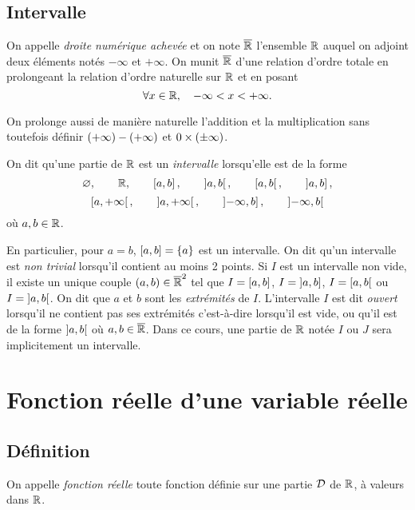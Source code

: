 \documentclass{magnoliaold}
\begin{document}
\subsection{Intervalle}


\begin{definition}[utile=-3]
On appelle \emph{droite numérique achevée} et on note $\overline{\mathbb{R}}$ l'ensemble $\mathbb{R}$ auquel
on adjoint deux éléments notés $-\infty$ et $+\infty$. On munit $\overline{\mathbb{R}}$ d'une
relation d'ordre totale en prolongeant la relation d'ordre naturelle sur $\mathbb{R}$
et en posant
\[\forall x\in\mathbb{R} ,\quad -\infty<x<+\infty.\]
\end{definition}

\begin{remarqueUnique}
\remarque On prolonge aussi de manière naturelle l'addition et la
  multiplication sans toutefois définir
  $\left(+\infty\right)-\left(+\infty\right)$ et $0\times\left(\pm \infty\right)$.
\end{remarqueUnique}

\begin{definition}
On dit qu'une partie de $\mathbb{R}$ est un \emph{intervalle} lorsqu'elle est de la forme
\[\varnothing, \qquad \mathbb{R}, \qquad \left[a,b\right], \qquad \left]a,b\right[, \qquad 
  \left[a,b\right[, \qquad \left]a,b\right],\]
\[\left[a,+\infty\right[, \qquad \left]a,+\infty\right[, \qquad \left]-\infty,b\right],
  \qquad \left]-\infty,b\right[\]
où $a,b\in\mathbb{R}$.
\end{definition}

\begin{remarques}
\remarque En particulier, pour $a=b$, $\left[a,b\right]=\left\{a\right\}$ est un intervalle.
  On dit qu'un intervalle est \emph{non trivial} lorsqu'il contient au moins 2 points.
\remarque Si $I$ est un intervalle non vide, il existe un unique couple $(a,b)\in\overline{\mathbb{R}}^2$ tel
  que $I=\left[a,b\right]$, $I=\left]a,b\right]$, $I=\left[a,b\right[$ ou
  $I=\left]a,b\right[$. On dit que $a$ et $b$ sont les
  \emph{extrémités} de $I$. L'intervalle $I$ est dit \emph{ouvert} lorsqu'il ne contient pas ses extrémités
  c'est-à-dire lorsqu'il est vide, ou qu'il est de la forme $\left]a,b\right[$ où $a,b\in\overline{\mathbb{R}}$.
\remarque Dans ce cours, une partie de $\mathbb{R}$ notée $I$ ou $J$ sera implicitement un intervalle.
\end{remarques}

\section{Fonction réelle d'une variable réelle}
\subsection{Définition}
\begin{definition}[utile=-3]
On appelle \emph{fonction réelle} toute fonction définie sur une partie $\mathcal{D}$ de $\mathbb{R}$,
à valeurs dans $\mathbb{R}$.
\end{definition}
\end{document}
